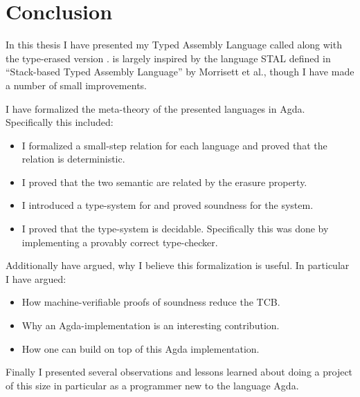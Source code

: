 \chapter{Conclusion}
\label{chap:conclusion}

In this thesis I have presented my Typed Assembly Language called \ATAL along
with the type-erased version \ATALe. \ATAL is largely inspired by the language
STAL defined in ``Stack-based Typed Assembly Language''\cite{STAL} by Morrisett
et al., though I have made a number of small improvements.

I have formalized the meta-theory of the presented languages in
Agda. Specifically this included:

\begin{itemize}
\item I formalized a small-step relation for each language and proved that the
  relation is deterministic.
\item I proved that the two semantic are related by the erasure property.
\item I introduced a type-system for \ATAL and proved soundness for the system.
\item I proved that the type-system is decidable. Specifically this was done by
  implementing a provably correct type-checker.
\end{itemize}

Additionally have argued, why I believe this formalization is useful. In
particular I have argued:

\begin{itemize}
\item How machine-verifiable proofs of soundness reduce the TCB.
\item Why an Agda-implementation is an interesting contribution.
\item How one can build on top of this Agda implementation.
\end{itemize}

Finally I presented several observations and lessons learned about doing a
project of this size in particular as a programmer new to the language Agda.
